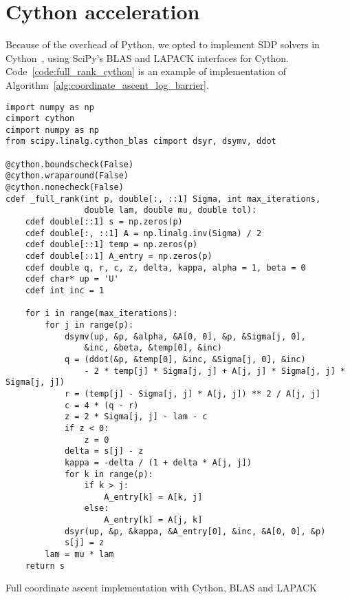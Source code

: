 \chapter{Cython acceleration}\label{ch:cython_acceleration}
Because of the overhead of Python, we opted to implement SDP solvers in Cython~\citep{cython},
using SciPy's BLAS and LAPACK interfaces for Cython.
Code~\ref{code:full_rank_cython} is an example of implementation of Algorithm~\ref{alg:coordinate_ascent_log_barrier}.
\begin{calgorithm}
\begin{verbatim}
import numpy as np
cimport cython
cimport numpy as np
from scipy.linalg.cython_blas cimport dsyr, dsymv, ddot

@cython.boundscheck(False)
@cython.wraparound(False)
@cython.nonecheck(False)
cdef _full_rank(int p, double[:, ::1] Sigma, int max_iterations,
                double lam, double mu, double tol):
    cdef double[::1] s = np.zeros(p)
    cdef double[:, ::1] A = np.linalg.inv(Sigma) / 2
    cdef double[::1] temp = np.zeros(p)
    cdef double[::1] A_entry = np.zeros(p)
    cdef double q, r, c, z, delta, kappa, alpha = 1, beta = 0
    cdef char* up = 'U'
    cdef int inc = 1

    for i in range(max_iterations):
        for j in range(p):
            dsymv(up, &p, &alpha, &A[0, 0], &p, &Sigma[j, 0],
                &inc, &beta, &temp[0], &inc)
            q = (ddot(&p, &temp[0], &inc, &Sigma[j, 0], &inc)
                - 2 * temp[j] * Sigma[j, j] + A[j, j] * Sigma[j, j] * Sigma[j, j])
            r = (temp[j] - Sigma[j, j] * A[j, j]) ** 2 / A[j, j]
            c = 4 * (q - r)
            z = 2 * Sigma[j, j] - lam - c
            if z < 0:
                z = 0
            delta = s[j] - z
            kappa = -delta / (1 + delta * A[j, j])
            for k in range(p):
                if k > j:
                    A_entry[k] = A[k, j]
                else:
                    A_entry[k] = A[j, k]
            dsyr(up, &p, &kappa, &A_entry[0], &inc, &A[0, 0], &p)
            s[j] = z
        lam = mu * lam
    return s
\end{verbatim}
\caption{
    Full coordinate ascent implementation with Cython, BLAS and LAPACK
}\label{code:full_rank_cython}
\end{calgorithm}
